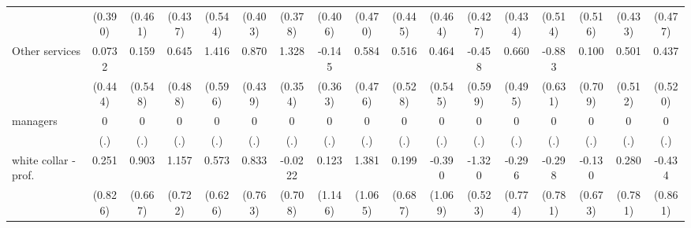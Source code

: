 {\begin{tabular}{l*{16}{c}}
                    &     (0.390)         &     (0.461)         &     (0.437)         &     (0.544)         &     (0.403)         &     (0.378)         &     (0.406)         &     (0.470)         &     (0.445)         &     (0.464)         &     (0.427)         &     (0.434)         &     (0.514)         &     (0.516)         &     (0.433)         &     (0.477)         \\
[1em]
Other services      &      0.0732         &       0.159         &       0.645         &       1.416\sym{*}  &       0.870\sym{*}  &       1.328\sym{***}&      -0.145         &       0.584         &       0.516         &       0.464         &      -0.458         &       0.660         &      -0.883         &       0.100         &       0.501         &       0.437         \\
                    &     (0.444)         &     (0.548)         &     (0.488)         &     (0.596)         &     (0.439)         &     (0.354)         &     (0.363)         &     (0.476)         &     (0.528)         &     (0.545)         &     (0.599)         &     (0.495)         &     (0.631)         &     (0.709)         &     (0.512)         &     (0.520)         \\
[1em]
managers            &           0         &           0         &           0         &           0         &           0         &           0         &           0         &           0         &           0         &           0         &           0         &           0         &           0         &           0         &           0         &           0         \\
                    &         (.)         &         (.)         &         (.)         &         (.)         &         (.)         &         (.)         &         (.)         &         (.)         &         (.)         &         (.)         &         (.)         &         (.)         &         (.)         &         (.)         &         (.)         &         (.)         \\
[1em]
white collar - prof.&       0.251         &       0.903         &       1.157         &       0.573         &       0.833         &     -0.0222         &       0.123         &       1.381         &       0.199         &      -0.390         &      -1.320\sym{*}  &      -0.296         &      -0.298         &      -0.130         &       0.280         &      -0.434         \\
                    &     (0.826)         &     (0.667)         &     (0.722)         &     (0.626)         &     (0.763)         &     (0.708)         &     (1.146)         &     (1.065)         &     (0.687)         &     (1.069)         &     (0.523)         &     (0.774)         &     (0.781)         &     (0.673)         &     (0.781)         &     (0.861)         \\

\end{tabular}}
